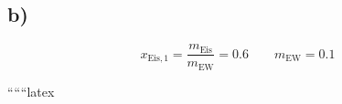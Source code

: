 

\subsection*{b)}

\[
x_{\text{Eis},1} = \frac{m_{\text{Eis}}}{m_{\text{EW}}} = 0.6 \quad \quad m_{\text{EW}} = 0.1
\]

``````latex